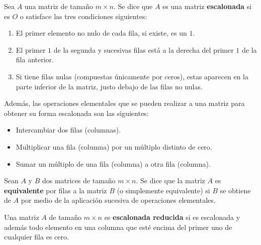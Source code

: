 \begin{definicion}
    Sea $A$ una matriz de tamaño $m \times n$. Se dice que $A$ es una matriz \textbf{escalonada} si es $O$ o satisface las tres condiciones siguientes:

    \begin{enumerate}
        \item El primer elemento no nulo de cada fila, si existe, es un $1$.
        \item El primer $1$ de la segunda y sucesivas filas está a la derecha del primer $1$ de la fila anterior.
        \item Si tiene filas nulas (compuestas únicamente por ceros), estas aparecen en la parte inferior de la matriz, justo debajo de las filas no nulas.\newline
    \end{enumerate}

    Además, las operaciones elementales que se pueden realizar a una matriz para obtener su forma escalonada son las siguientes:

    \begin{itemize}
        \item Intercambiar dos filas (columnas).
        \item Multiplicar una fila (columna) por un múltiplo distinto de cero.
        \item Sumar un múltiplo de una fila (columna) a otra fila (columna).\newline
    \end{itemize}
\end{definicion}

\begin{definicion}
    Sean $A$ y $B$ dos matrices de tamaño $m \times n$. Se dice que la matriz $A$ es \textbf{equivalente} por filas a la matriz $B$ (o simplemente equivalente) si $B$ se obtiene de $A$ por medio de la aplicación sucesiva de operaciones elementales.\newline
\end{definicion}

\begin{definicion}
    Una matriz $A$ de tamaño $m \times n$ es \textbf{escalonada reducida} si es escalonada y además todo elemento en una columna que esté encima del primer uno de cualquier fila es cero.
\end{definicion}

